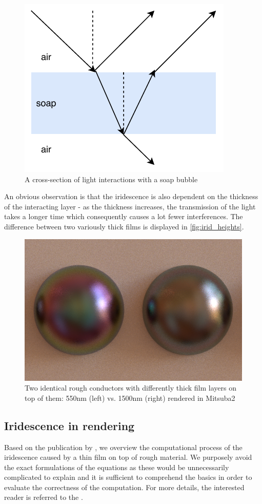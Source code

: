 \begin{figure}[h]
	\centering
	\includegraphics[width=.6\linewidth]{img/soap.pdf}
	\caption{A cross-section of light interactions with a soap bubble}
	\label{fig:soap}
\end{figure}

An obvious observation is that the iridescence is also dependent on the thickness of the interacting layer - as the thickness increases, the transmission of the light takes a longer time which consequently causes a lot fewer interferences. The difference between two variously thick films is displayed in \autoref{fig:irid_heights}.

\begin{figure}[h]
	\centering
	\includegraphics[width=.6\linewidth]{img/irid_heights.png}
	\caption{Two identical rough conductors with differently thick film layers on top of them: 550nm (left) vs. 1500nm (right) rendered in Mitsuba2}
	\label{fig:irid_heights}
\end{figure}

\subsection{Iridescence in rendering}

Based on the publication by \citet{belcour2017practical}, we overview the computational process of the iridescence caused by a thin film on top of rough material. We purposely avoid the exact formulations of the equations as these would be unnecessarily complicated to explain and it is sufficient to comprehend the basics in order to evaluate the correctness of the computation. For more details, the interested reader is referred to the \citet{belcour2017practical}.


